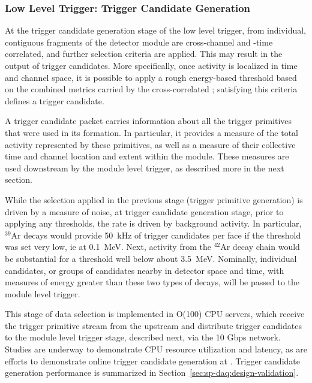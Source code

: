 \subsubsection{Low Level Trigger: Trigger Candidate Generation}

At the trigger candidate generation stage of the low level trigger,
 from individual, contiguous fragments of the
detector 
module are cross-channel and -time correlated, and further selection
criteria are applied. This may result in the
output of trigger candidates. 
More specifically, once activity is localized in time and channel
space, it is
possible to apply a rough energy-based threshold based on the combined
metrics carried by the cross-correlated ;
satisfying this criteria defines a trigger candidate. 

A trigger candidate packet carries information about all the trigger
primitives that were used in its formation. 
In particular, it provides a measure of the total activity represented
by these primitives, as well as a measure of their collective time and channel
location and extent within the module.
These measures are used downstream by the module level trigger, 
as described more in the next section.

While the selection applied in the previous stage (trigger primitive
generation) is driven by a measure of noise, at trigger candidate
generation stage, prior to applying any thresholds, the rate is driven by
background activity.  
In particular, $^{39}$Ar decays would provide \SI{50}{\kilo\hertz} of
trigger candidates per  face if the threshold was set very low, ie at
\SI{0.1}{\MeV}.
Next, activity from the $^{42}$Ar decay chain would be substantial for a
threshold well below about \SI{3.5}{\MeV}.
Nominally, individual candidates, or groups of candidates nearby in
detector space and time, with measures of energy greater than these two
types of decays, will be passed to the module level trigger. 

This stage of data selection is
implemented in O(100) CPU servers, which receive the trigger primitive
stream from the upstream  and distribute trigger candidates to the
module level trigger stage, described next, via the 10 Gbps  network. Studies are
underway to demonstrate CPU resource utilization and latency, as are
efforts to demonstrate online trigger candidate generation at .
Trigger candidate generation performance is summarized in
Section~\ref{sec:sp-daq:design-validation}. 

